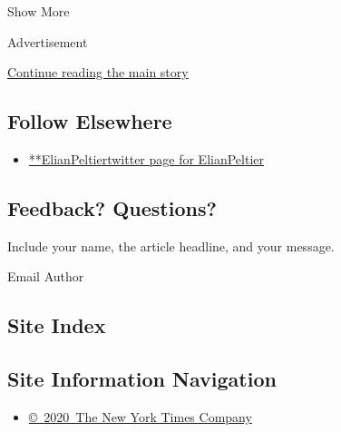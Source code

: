 Show More

Advertisement

\protect\hyperlink{after-mid2}{Continue reading the main story}

\hypertarget{follow-elsewhere}{%
\subsection{Follow Elsewhere}\label{follow-elsewhere}}

\begin{itemize}
\tightlist
\item
  \href{https://twitter.com/ElianPeltier}{**ElianPeltiertwitter page for
  ElianPeltier}
\end{itemize}

\hypertarget{feedback-questions}{%
\subsection{Feedback? Questions?}\label{feedback-questions}}

Include your name, the article headline, and your message.

Email Author

\hypertarget{site-index}{%
\subsection{Site Index}\label{site-index}}

\hypertarget{site-information-navigation}{%
\subsection{Site Information
Navigation}\label{site-information-navigation}}

\begin{itemize}
\tightlist
\item
  \href{https://help.nytimes3xbfgragh.onion/hc/en-us/articles/115014792127-Copyright-notice}{©~2020~The
  New York Times Company}
\end{itemize}


